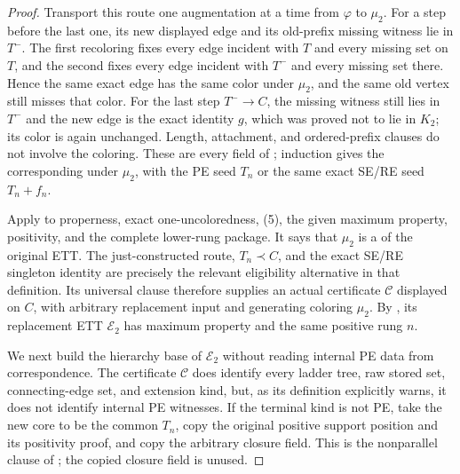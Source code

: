 \begin{proof}
Transport this route one augmentation at a time from $\varphi$ to
$\mu_2$.  For a step before the last one, its new displayed edge and its
old-prefix missing witness lie in $T^-$.  The first recoloring fixes every
edge incident with $T$ and every missing set on $T$, and the second fixes
every edge incident with $T^-$ and every missing set there.  Hence the
same exact edge has the same color under $\mu_2$, and the same old vertex
still misses that color.  For the last step $T^-\to C$, the missing
witness still lies in $T^-$ and the new edge is the exact identity $g$,
which was proved not to lie in $K_2$; its color is again unchanged.
Length, attachment, and ordered-prefix clauses do not involve the
coloring.  These are every field of
; induction gives the corresponding
 under $\mu_2$, with the PE seed
$T_n$ or the same exact SE/RE seed $T_n+f_n$.

Apply  to properness, exact one-uncoloredness, (5), the
given maximum property, positivity, and the complete lower-rung package.
It says that $\mu_2$ is a  of the original ETT.
The just-constructed route, $T_n\prec C$, and the exact SE/RE singleton
identity are precisely the relevant eligibility alternative in that
definition.  Its universal clause therefore supplies an actual
 certificate
$\mathcal C$ displayed on $C$, with arbitrary replacement input and
generating coloring $\mu_2$.  By
, its replacement ETT
$\mathcal E_2$ has maximum property and the same positive rung $n$.

We next build the hierarchy base of $\mathcal E_2$ without reading
internal PE data from correspondence.  The certificate $\mathcal C$
does identify every ladder tree, raw stored set, connecting-edge set, and
extension kind, but, as its definition explicitly warns, it does not
identify internal PE witnesses.  If the terminal kind is not PE, take
the new core to be the common $T_n$, copy the original positive support
position and its positivity proof, and copy the arbitrary closure field.
This is the nonparallel clause of ; the copied
closure field is unused.


\end{proof}
